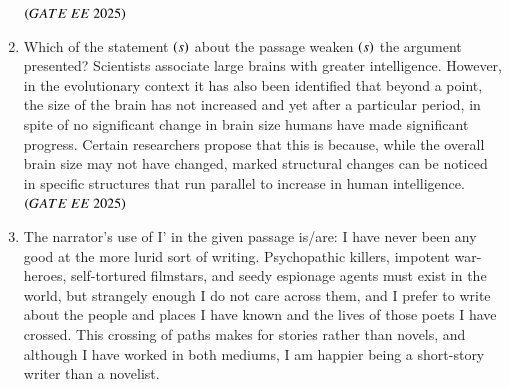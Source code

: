 \documentclass[journal,12pt,onecolumn]{IEEEtran}
\theoremstyle{remark}
\begin{document}
\begin{enumerate}
\hfill $\brak{GATE\ EE\ 2025}$
    \begin{enumerate}
      \end{enumerate}
  \item Which of the statement $\left(s\right)$ about the passage weaken $\left(s\right)$ the argument presented? 
Scientists associate large brains with greater intelligence. However, in the evolutionary context it has also been identified that beyond a point, the size of the brain has not increased and yet after a particular period, in spite of no significant change in brain size humans have made significant progress. Certain researchers propose that this is because, while the overall brain size may not have changed, marked structural changes can be noticed in specific structures that run parallel to increase in human intelligence.    
\hfill $\brak{GATE\ EE\ 2025}$
    \begin{enumerate}
      \end{enumerate}
  \item The narrator's use of I' in the given passage is/are:    
 I have never been any good at the more lurid sort of writing. Psychopathic killers, impotent war-heroes, self-tortured filmstars, and seedy espionage agents must exist in the world, but strangely enough I do not care across them, and I prefer to write about the people and places I have known and the lives of those poets I have crossed. This crossing of paths makes for stories rather than novels, and although I have worked in both mediums, I am happier being a short-story writer than a novelist. 

\end{enumerate}
\end{document}
